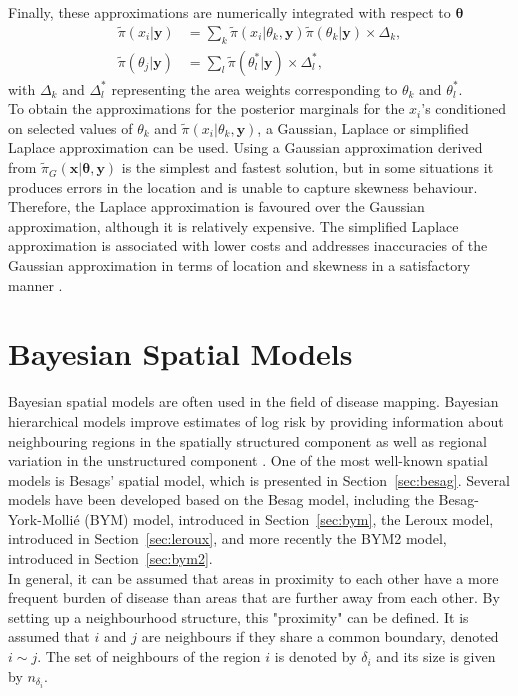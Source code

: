 Finally, these approximations are numerically integrated with respect to $\pmb{\theta}$
\begin{align}
    \widetilde{\pi}\left(x_i|\pmb{y}\right)&=\sum_k\widetilde{\pi}\left(x_i|\theta_k,\pmb{y}\right)\widetilde{\pi}\left(\theta_k|\pmb{y}\right)\times\Delta_k,\\
    \widetilde{\pi}\left(\theta_j|\pmb{y}\right)&=\sum_l\widetilde{\pi}\left(\theta_l^*|\pmb{y}\right)\times\Delta_l^*,
\end{align}
with $\Delta_k$ and $\Delta_l^*$ representing the area weights corresponding to $\theta_k$ and $\theta_l^*$. \\
To obtain the approximations for the posterior marginals for the $x_i$'s conditioned on selected values of $\theta_k$ and $\widetilde{\pi}\left(x_i|\theta_k,\pmb{y}\right)$, a Gaussian, Laplace or simplified Laplace approximation can be used. Using a Gaussian approximation derived from $\widetilde{\pi}_G\left(\pmb{x}|\pmb{\theta},\pmb{y}\right)$ is the simplest and fastest solution, but in some situations it produces errors in the location and is unable to capture skewness behaviour. Therefore, the Laplace approximation is favoured over the Gaussian approximation, although it is relatively expensive. The simplified Laplace approximation is associated with lower costs and addresses inaccuracies of the Gaussian approximation in terms of location and skewness in a satisfactory manner \autocite[][]{rue2009approximate, rue2017bayesian}.
\clearpage
\section{Bayesian Spatial Models}
Bayesian spatial models are often used in the field of disease mapping. Bayesian hierarchical
models improve estimates of log risk by providing information about neighbouring regions in the spatially structured component as well as regional variation in the unstructured component \autocite[][]{blangiardo2015spatial}. One of the most well-known spatial models is Besags' spatial model, which is presented in Section~\ref{sec:besag}. Several models have been developed based on the Besag model, including the Besag-York-Mollié (BYM) model, introduced in Section~\ref{sec:bym}, the Leroux model, introduced in Section~\ref{sec:leroux}, and more recently the BYM2 model, introduced in Section~\ref{sec:bym2}. \\
In general, it can be assumed that areas in proximity to each other have a more frequent burden of disease than areas that are further away from each other. By setting up a neighbourhood structure, this "proximity" can be defined. It is assumed that $i$ and $j$ are neighbours if they share a common boundary, denoted $i\sim j$. The set of neighbours of the region $i$ is denoted by $\delta_i$ and its size is given by $n_{\delta_i}$.
